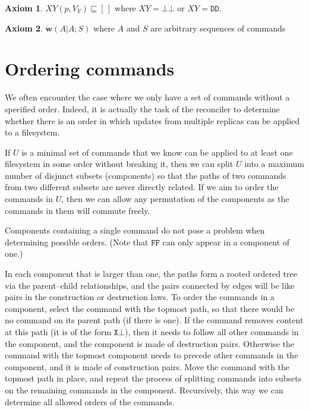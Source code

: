 \documentclass[12pt]{article}
\newcommand{\empt}{\bot}
\newcommand{\fscommand}[2]{{#1#2}}
\newcommand{\fsregcommandchar}[1]{\mathtt{#1}}
\newcommand{\fsregcommand}[2]{\fscommand{\fsregcommandchar{#1}}{\fsregcommandchar{#2}}}
\newcommand{\cbb}{\fsregcommand{\empt}{\empt}}
\newcommand{\cff}{\fsregcommand{F}{F}}
\newcommand{\cdd}{\fsregcommand{D}{D}}
\newcommand{\cxy}{\fscommand{X}{Y}}
\newcommand{\eqext}{\sqsubseteq}
\newcommand{\worksc}[2]{\dot{\mathbf{w}}({#1}|{#2})}
\newcommand{\emptyseq}{[\,]}
\theoremstyle{definition}
\newtheorem{myax}{Axiom}
\begin{document}
\begin{myax}\label{ax_assert}
$\cxy(p,V_Y) \eqext \emptyseq$ where $\cxy=\cbb$ or $\cxy=\cdd$.
\end{myax}

\begin{myax}\label{worksextpostfix}
$\worksc{A}{A;S}$ where $A$ and $S$ are arbitrary sequences of commands
\end{myax}


\section{Ordering commands}

We often encounter the case where we only have a set of commands without a specified order.
Indeed, it is actually the task of the reconciler to determine whether there is an order
in which updates from multiple replicas can be applied to a filesystem.

If $U$ is a minimal set of commands
that we know can be applied to at least one filesystem in some order without breaking it,
then we can split $U$ into a maximum number of disjunct subsets
(components) so that the paths of two commands from two different subsets are never directly related.
If we aim to order the commands in $U$, then we can allow any permutation of 
the components as the commands in them will commute freely.

Components containing a single command do not pose a problem when determining
possible orders.
(Note that $\cff$ can only appear in a component of one.)

In each component that is larger than one, the paths 
form a rooted ordered tree via the parent--child relationships,
and the pairs connected by edges will be like pairs in the
construction or destruction laws.
To order the commands in a component,
select the command with the topmost path, so that there would be no command
on its parent path (if there is one). 
If the command removes content at this path (it is of the form $\fsregcommand{X}{\empt}$), then it
needs to follow all other commands in the component, and
the component is made of destruction pairs.
Otherwise the command with the topmost component needs to precede other commands
in the component, and it is made of construction pairs.
Move the command with the topmost path in place, and
repeat the process of splitting commands into subsets on the remaining commands
in the component. Recursively, this way we can determine all allowed orders of the commands.
\end{document}
